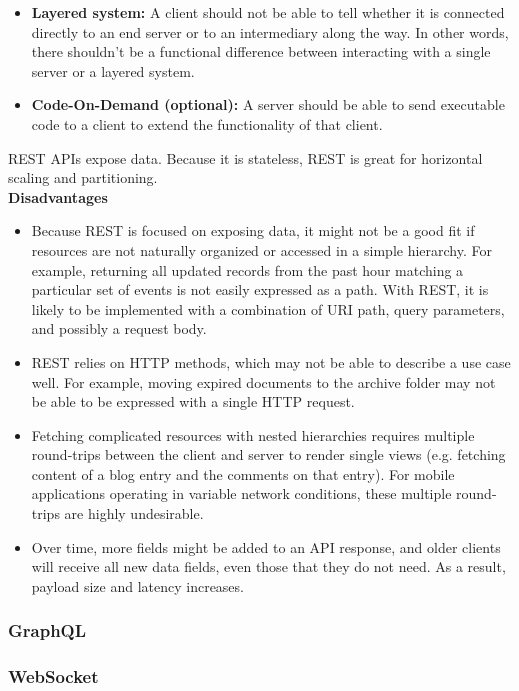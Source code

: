 \documentclass[12pt, titlepage]{article}
\begin{document}
\begin{itemize}
\begin{enumerate}
  \end{enumerate}
  \item \textbf{Layered system:} A client should not be able to tell whether it is connected directly to an end server or to an intermediary along the way. In other words, there shouldn't be a functional difference between interacting with a single server or a layered system.
  \item \textbf{Code-On-Demand (optional):} A server should be able to send executable code to a client to extend the functionality of that client.
\end{itemize}

REST APIs expose data. Because it is stateless, REST is great for horizontal scaling and partitioning. \\

\textbf{Disadvantages}
\begin{itemize}
  \item Because REST is focused on exposing data, it might not be a good fit if resources are not naturally organized or accessed in a simple hierarchy. For example, returning all updated records from the past hour matching a particular set of events is not easily expressed as a path. With REST, it is likely to be implemented with a combination of URI path, query parameters, and possibly a request body.
  \item REST relies on HTTP methods, which may not be able to describe a use case well. For example, moving expired documents to the archive folder may not be able to be expressed with a single HTTP request.
  \item Fetching complicated resources with nested hierarchies requires multiple round-trips between the client and server to render single views (e.g. fetching content of a blog entry and the comments on that entry). For mobile applications operating in variable network conditions, these multiple round-trips are highly undesirable.
  \item Over time, more fields might be added to an API response, and older clients will receive all new data fields, even those that they do not need. As a result, payload size and latency increases.
\end{itemize}

\subsubsection{GraphQL}

\subsubsection{WebSocket}
\end{document}
